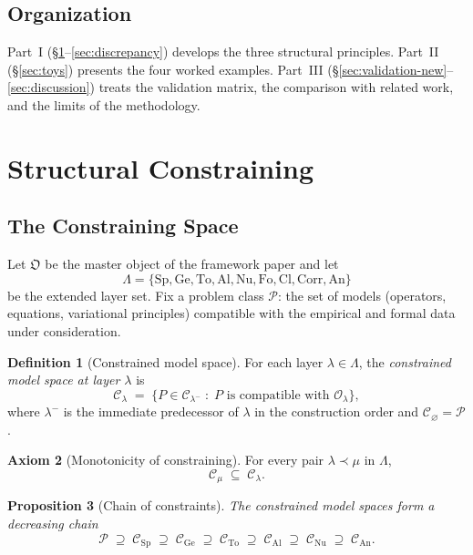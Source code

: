 \documentclass[11pt,a4paper]{article}
\theoremstyle{definition}
\newtheorem{definition}{Definition}[section]
\newtheorem{axiom}[definition]{Axiom}
\theoremstyle{plain}
\newtheorem{proposition}[definition]{Proposition}
\newcommand{\Lam}{\Lambda}
\newcommand{\Sp}{\mathrm{Sp}}
\newcommand{\Ge}{\mathrm{Ge}}
\newcommand{\To}{\mathrm{To}}
\newcommand{\Al}{\mathrm{Al}}
\newcommand{\Nu}{\mathrm{Nu}}
\newcommand{\Fo}{\mathrm{Fo}}
\newcommand{\Cl}{\mathrm{Cl}}
\newcommand{\Corr}{\mathrm{Corr}}
\newcommand{\An}{\mathrm{An}}
\newcommand{\Ob}{\mathfrak{O}}
\newcommand{\Ocal}{\mathcal{O}}
\newcommand{\Ccal}{\mathcal{C}}
\begin{document}
\subsection{Organization}

Part~I (\S\ref{sec:constraining}--\ref{sec:discrepancy}) develops the
three structural principles. Part~II (\S\ref{sec:toys}) presents the
four worked examples. Part~III (\S\ref{sec:validation-new}--\ref{sec:discussion})
treats the validation matrix, the comparison with related work, and
the limits of the methodology.

\section{Structural Constraining}
\label{sec:constraining}

\subsection{The Constraining Space}

Let $\Ob$ be the master object of the framework paper and let
\[
  \Lam = \{\Sp, \Ge, \To, \Al, \Nu, \Fo, \Cl, \Corr, \An\}
\]
be the extended layer set. Fix a problem class $\mathcal P$: the set
of models (operators, equations, variational principles) compatible
with the empirical and formal data under consideration.

\begin{definition}[Constrained model space]\label{def:constrained-space}
For each layer $\lambda \in \Lam$, the \emph{constrained model space
at layer $\lambda$} is
\[
  \Ccal_\lambda
  \;=\;
  \bigl\{ P \in \Ccal_{\lambda^-} \;:\;
    P \text{ is compatible with } \Ocal_\lambda \bigr\},
\]
where $\lambda^-$ is the immediate predecessor of $\lambda$ in the
construction order and $\Ccal_{\varnothing} = \mathcal P$.
\end{definition}

\begin{axiom}[Monotonicity of constraining]\label{ax:monotone}
For every pair $\lambda \prec \mu$ in $\Lam$,
\[
  \Ccal_\mu \;\subseteq\; \Ccal_\lambda .
\]
\end{axiom}

\begin{proposition}[Chain of constraints]\label{prop:chain}
The constrained model spaces form a decreasing chain
\[
  \mathcal P
  \;\supseteq\;
  \Ccal_\Sp
  \;\supseteq\;
  \Ccal_\Ge
  \;\supseteq\;
  \Ccal_\To
  \;\supseteq\;
  \Ccal_\Al
  \;\supseteq\;
  \Ccal_\Nu
  \;\supseteq\;
  \Ccal_\An .
\]
\end{proposition}
\end{document}
